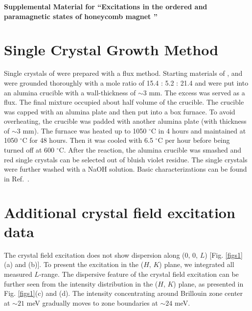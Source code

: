 \documentclass[%
reprint,
superscriptaddress,
amsmath,amssymb,
aps,
prb,
]{revtex4-2}
\begin{document}
\widetext
\begin{center}
\textbf{\large Supplemental Material for ``Excitations in the ordered and paramagnetic states of honeycomb magnet ''}
\end{center}
\setcounter{equation}{0}
\setcounter{figure}{0}
\setcounter{table}{0}
\setcounter{page}{1}
\makeatletter
\renewcommand{\theequation}{S\arabic{equation}}
\renewcommand{\thefigure}{S\arabic{figure}}

\section{Single Crystal Growth Method}
	Single crystals of  were prepared with a flux method. Starting materials of ,  and  were grounded thoroughly with a mole ratio of 15.4 : 5.2 : 21.4 and were put into an alumina crucible with a wall-thickness of $\sim3$ mm. The excess  was served as a flux. The final mixture occupied about half volume of the crucible. The crucible was capped with an alumina plate and then put into a box furnace. To avoid overheating, the crucible was padded with another alumina plate (with thickness of $\sim3$ mm). The furnace was heated up to 1050 $^{\circ}$C in 4 hours and maintained at 1050 $^{\circ}$C for 48 hours. Then it was cooled with 6.5 $^{\circ}$C per hour before being turned off at 600 $^{\circ}$C. After the reaction, the alumina crucible was smashed and red single crystals can be selected out of bluish violet residue. The single crystals were further washed with a NaOH solution. Basic characterizations can be found in Ref.~\cite{YaoPRB2020}.
	
	\section{Additional crystal field excitation data}
	
	The crystal field excitation does not show dispersion along (0, 0, $L$) [Fig. \ref{figs1}(a) and (b)]. To present the excitation in the ($H$, $K$) plane, we integrated all measured $L$-range. The dispersive feature of the crystal field excitation can be further seen from the intensity distribution in the ($H$, $K$) plane, as presented in Fig. \ref{figs1}(c) and (d). The intensity concentrating around Brillouin zone center at $\sim21$ meV gradually moves to zone boundaries at $\sim24$ meV.
\end{document}
